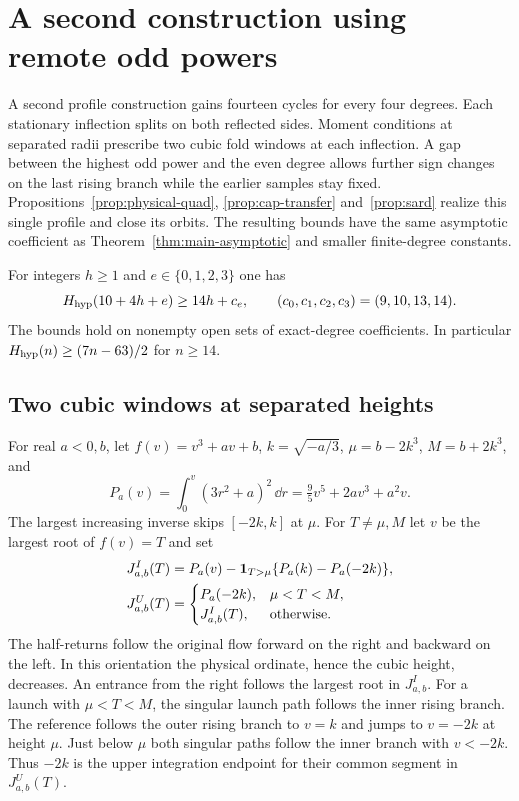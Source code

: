 \section{A second construction using remote odd powers}\label{sec:remote}
A second profile construction gains fourteen cycles for every four
degrees. Each stationary inflection splits on both reflected sides.
Moment conditions at separated radii prescribe two cubic fold windows
at each inflection. A gap between the highest odd power and the even
degree allows further sign changes on the last rising branch while
the earlier samples stay fixed. Propositions~\ref{prop:physical-quad},
\ref{prop:cap-transfer} and~\ref{prop:sard} realize this single profile
and close its orbits. The resulting bounds have the same asymptotic
coefficient as Theorem~\ref{thm:main-asymptotic} and smaller finite-degree
constants.

\begin{proposition}\label{prop:remote-odd}
For integers $h\ge1$ and $e\in\{0,1,2,3\}$ one has
\begin{equation}\label{eq:remote-formula}
 H_{\mathrm{hyp}}(10+4h+e)\ge14h+c_e,\qquad(c_0,c_1,c_2,c_3)=(9,10,13,14).
\end{equation}
The bounds hold on nonempty open sets of exact-degree coefficients.
In particular $H_{\mathrm{hyp}}(n)\ge(7n-63)/2$ for $n\ge14$.
\end{proposition}

\subsection{Two cubic windows at separated heights}
For real $a<0,b$, let $f(v)=v^3+av+b$, $k=\sqrt{-a/3}$,
$\mu=b-2k^3$, $M=b+2k^3$, and
\[
 P_a(v)=\int_0^v(3r^2+a)^2\,\dd r=\tfrac95v^5+2av^3+a^2v.
\]
The largest increasing inverse skips $[-2k,k]$ at $\mu$.
For $T\ne\mu,M$ let $v$ be the largest root of $f(v)=T$ and set
\begin{align}
 J^I_{a,b}(T)&=P_a(v)-\mathbf{1}_{T>\mu}\{P_a(k)-P_a(-2k)\},\nonumber\\
 J^U_{a,b}(T)&=
 \begin{cases} P_a(-2k),&\mu<T<M,\\ J^I_{a,b}(T),&\text{otherwise}.
 \end{cases}                                                     \label{eq:remote-cubic}
\end{align}
The half-returns follow the original flow forward on the right and
backward on the left. In this orientation the physical ordinate, hence
the cubic height, decreases. An entrance from the right follows the
largest root in $J^I_{a,b}$. For a launch with $\mu<T<M$, the singular
launch path follows the inner rising branch. The reference follows the
outer rising branch to $v=k$ and jumps to $v=-2k$ at height $\mu$.
Just below $\mu$ both singular paths follow the inner branch with $v<-2k$.
Thus $-2k$ is the upper integration endpoint for their common segment
in $J^U_{a,b}(T)$.

